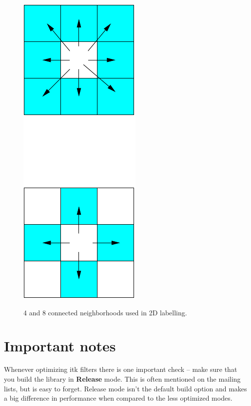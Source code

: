\documentclass[IJ]{cesj}
\begin{document}
\begin{figure}[htbp]
\begin{center}
\includegraphics{connect}
\label{fig:neigh}
\caption{4 and 8 connected neighborhoods used in 2D labelling.}
\end{center}
\end{figure}

\section{Important notes}
Whenever optimizing itk filters there is one important check -- make
sure that you build the library in {\bf Release} mode. This is often
mentioned on the mailing lists, but is easy to forget. Release mode
isn't the default build option and makes a big difference in
performance when compared to the less optimized modes.
\end{document}
